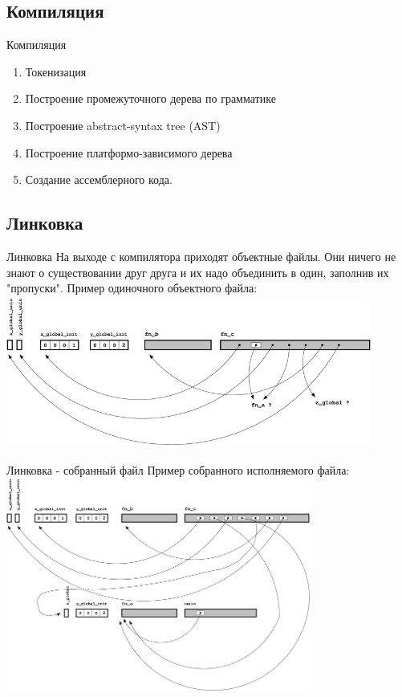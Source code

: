 \documentclass[10pt]{beamer}
\begin{document}
\subsection{Компиляция}
\begin{frame}[fragile]{Компиляция}
\begin{enumerate}
    \item Токенизация
    \item Построение промежуточного дерева по грамматике
    \item Построение abstract-syntax tree (AST)
    \item Построение платформо-зависимого дерева
    \item Создание ассемблерного кода.
\end{enumerate}
\end{frame}

\subsection{Линковка}
\begin{frame}[fragile]{Линковка}
На выходе с компилятора приходят объектные файлы. Они ничего не знают о существовании друг друга и их надо объединить в один, заполнив их "пропуски". Пример одиночного объектного файла:
 \includegraphics[width=12cm, height=5cm]{Term_3/Source/Pictures/c_parts.png}
\end{frame}

\begin{frame}[fragile]{Линковка - собранный файл}
Пример собранного исполняемого файла:
 \includegraphics[width=10cm, height=7cm]{Term_3/Source/Pictures/c_parts_linked.png}
\end{frame}
\end{document}
